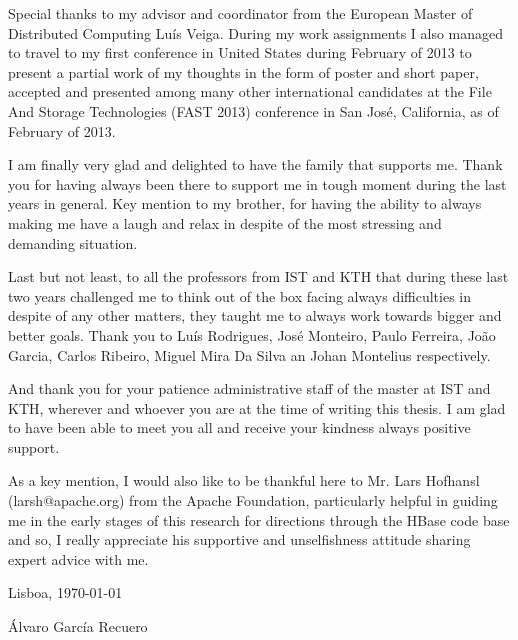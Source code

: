 Special thanks to my advisor and coordinator from the European Master of Distributed Computing Luís Veiga. During my work assignments I also managed to travel to my first conference in United States during February of 2013 to present a partial work of my thoughts in the form of poster and short paper, accepted and presented among many other international candidates at the File And Storage Technologies (FAST 2013) conference in San José, California, as of February of 2013.

I am finally very glad and delighted to have the family that supports me. Thank you for having always been there to support me in tough moment during the last years in general. Key mention to my brother, for having the ability to always making me have a laugh and relax in despite of the most stressing and demanding situation.

Last but not least, to all the professors from IST and KTH that during these last two years challenged me to think out of the box facing always difficulties in despite of any other matters, they taught me to always work towards bigger and better goals. Thank you to Luís Rodrigues, José Monteiro, Paulo Ferreira, João Garcia, Carlos Ribeiro, Miguel Mira Da Silva an Johan Montelius respectively. 

And thank you for your patience administrative staff of the master at IST and KTH, wherever and whoever you are at the time of writing this thesis. I am glad to have been able to meet you all and receive your kindness always positive support.

As a key mention, I would also like to be thankful here to Mr. Lars Hofhansl (larsh@apache.org) from the Apache Foundation, particularly helpful in guiding me in the early stages of this research for directions through the HBase code base and so, I really appreciate his supportive and unselfishness attitude sharing expert advice with me.
\vfill
\begin{flushright}
  \begin{minipage}{8cm}
    \begin{center}
      Lisboa, \today

      Álvaro García Recuero
    \end{center}
  \end{minipage}
\end{flushright}

\cleardoublepage


